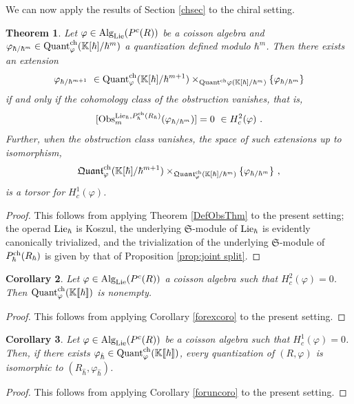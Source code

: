 \documentclass[11pt]{amsart}
\numberwithin{equation}{section}
\newtheorem{theo}{Theorem}[section]
\newtheorem{coro}[theo]{Corollary}
\theoremstyle{definition}
\newcommand{\bb}{\mathbb}
\newcommand{\mf}{\mathfrak}
\newcommand{\fph}{{[\![\hbar]\!]}}
\newcommand{\K}{{\bb K}}
\newcommand{\ik}{{\bb K}}
\newcommand{\Obs}{{\textup{Obs}}}
\newcommand{\Quant}{{\textup{Quant}}}
\newcommand{\fQuant}{{\mathfrak{Quant}}}
\newcommand{\Alg}{{\textup{Alg}}}
\newcommand{\Lie}{{\textup{Lie}}}
\newcommand{\ch}{{\textup{ch}}}
\newcommand{\Ss}{{{\mf{S}}}}
\newcommand{\0}{{\textbf{0}}}
\def\ch{{\rm ch}}
\def \mf{\mathfrak}
\def \vph{\varphi_{\hat \hbar}}
\def \hhb{{\hat \hbar}}
\begin{document}
\subsubsection{}

We can now apply the results of Section \ref{chsec} to the chiral setting.
\begin{theo}\label{DefObsQuantChThm} Let $\varphi\in \Alg_{\Lie}(P^c(R))$ be a coisson algebra and $\varphi_{\hbar/\hbar^{m}}\in\Quant^\ch_\varphi(\K[\hbar]/\hbar^{m}) $ a quantization defined modulo $\hbar^m$. Then there exists an extension
	\[ \varphi_{ \hbar / \hbar^{m+1}} \  \in \Quant^\ch_\varphi(\K[\hbar]/\hbar^{m+1}) \times_{\Quant^\ch\varphi(\K[\hbar]/\hbar^{m}) } \{\varphi_{\hbar/\hbar^{m}} \}\]
	if and only if the cohomology class of the obstruction vanishes, that is,
	\[ 
	[ \Obs^{\Lie_\hbar, P_\hbar^\ch(R_\hbar)}_m(\varphi_{\hbar/\hbar^{m}})]= 0 \ \in H^{2}_{c}(\varphi) \ .
	\]
	Further, when the obstruction class vanishes, the space of such extensions up to isomorphism,
	\[  \fQuant^\ch_\varphi(\K[\hbar]/\hbar^{m+1}) \times_{\fQuant_\varphi^\ch(\K[\hbar]/\hbar^{m}) } \{\varphi_{\hbar/\hbar^{m}} \} \ , \]
	is a torsor for $H^{1}_{c}(\varphi)$.
\end{theo}
\begin{proof} This follows from applying Theorem \ref{DefObsThm} to the present setting; the operad $\Lie_\hbar$ is Koszul, the underlying $\Ss$-module of $\Lie_\hbar$ is evidently canonically trivialized, and the trivialization of the underlying $\Ss$-module of $P^\ch_\hbar(R_\hbar)$ is given by that of Proposition \ref{prop:joint split}.
\end{proof}



\begin{coro} \label{Coisquantexistthm}
Let $\varphi\in \Alg_{\Lie}(P^c(R))$ a coisson algebra such that $H^{2}_{c}(\varphi)=0$. Then $\Quant^\ch_\varphi(\ik\fph)$ is nonempty.
\end{coro}
\begin{proof}
This follows from applying Corollary \ref{forexcoro} to the present setting.
\end{proof}

\begin{coro} \label{Coisquantrigidthm}
Let $\varphi\in \Alg_{\Lie}(P^c(R))$ be a coisson algebra such that $H^{1}_{c}(\varphi)=0$. Then, if there exists $\vph\in\Quant^\ch_\varphi(\ik\fph)$, every quantization of $(R,\varphi)$ is isomorphic to $(R_\hhb,\vph)$.
\end{coro}
\begin{proof}
	This follows from applying Corollary \ref{foruncoro} to the present setting.
\end{proof}
\end{document}
